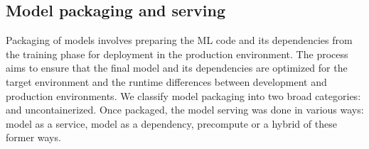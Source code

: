 \subsection{Model packaging and serving
}


Packaging of models involves preparing the ML \DIFdelbegin {}\DIFdelend code and its dependencies from the training phase for deployment in the production environment. The process aims to ensure that the final model and its dependencies are optimized for the target environment and \DIFdelbegin {}\DIFdelend \DIFaddbegin {}\DIFaddend the runtime differences between development and production environments\DIFdelbegin {}\DIFdelend . We classify model packaging into two broad categories: \DIFdelbegin {}\DIFdelend \DIFaddbegin {}\DIFaddend and uncontainerized. Once packaged, the model serving was done in various ways: model as a service, model as a dependency, precompute or a hybrid of these former ways. 

